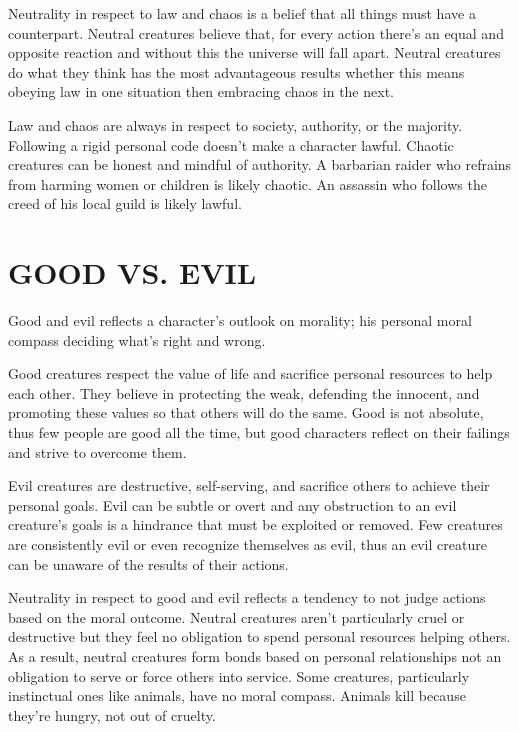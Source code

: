 \begin{multicols}{2}
Neutrality in respect to law and chaos is a belief that all things must have a counterpart.  Neutral creatures believe that, for every action there's an equal and opposite reaction and without this the universe will fall apart.  Neutral creatures do what they think has the most advantageous results whether this means obeying law in one situation then embracing chaos in the next.

Law and chaos are always in respect to society, authority, or the majority.  Following a rigid personal code doesn't make a character lawful.  Chaotic creatures can be honest and mindful of authority.  A barbarian raider who refrains from harming women or children is likely chaotic.  An assassin who follows the creed of his local guild is likely lawful.

\section{GOOD VS. EVIL}

Good and evil reflects a character's outlook on morality; his personal moral compass deciding what's right and wrong.

Good creatures respect the value of life and sacrifice personal resources to help each other.  They believe in protecting the weak, defending the innocent, and promoting these values so that others will do the same.  Good is not absolute, thus few people are good all the time, but good characters reflect on their failings and strive to overcome them.  

Evil creatures are destructive, self-serving, and sacrifice others to achieve their personal goals.  Evil can be subtle or overt and any obstruction to an evil creature's goals is a hindrance that must be exploited or removed.  Few creatures are consistently evil or even recognize themselves as evil, thus an evil creature can be unaware of the results of their actions.

Neutrality in respect to good and evil reflects a tendency to not judge actions based on the moral outcome.  Neutral creatures aren't particularly cruel or destructive but they feel no obligation to spend personal resources helping others.  As a result, neutral creatures form bonds based on personal relationships not an obligation to serve or force others into service.  Some creatures, particularly instinctual ones like animals, have no moral compass.  Animals kill because they're hungry, not out of cruelty.  


\end{multicols}
